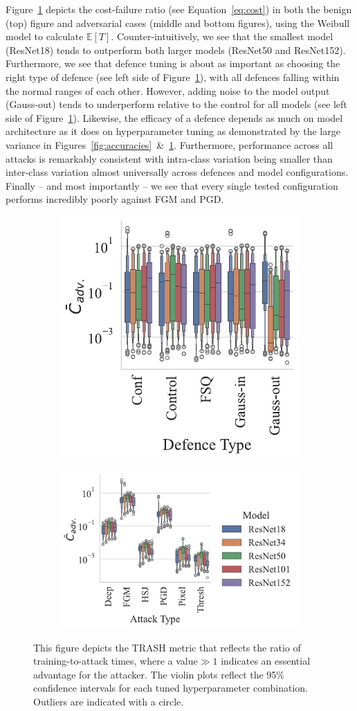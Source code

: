 Figure~\ref{fig:failures_per_train_time} depicts the cost-failure ratio (see Equation~\ref{eq:cost}) in both the benign (top) figure and adversarial cases (middle and bottom figures), using the Weibull model to calculate $\mathbb{E}[T]$. Counter-intuitively, we see that the smallest model (ResNet18) tends to outperform both larger models (ResNet50 and ResNet152). Furthermore, we see that defence tuning is about as important as choosing the right type of defence (see left side of Figure~\ref{fig:failures_per_train_time}), with all defences falling within the normal ranges of each other. However, adding noise to the model output (Gauss-out) tends to underperform relative to the control for all models (see left side of Figure~\ref{fig:failures_per_train_time}). Likewise, the efficacy of a defence depends as much on model architecture as it does on hyperparameter tuning as demonstrated by the large variance in Figures~\ref{fig:accuracies}~\&~\ref{fig:failures_per_train_time}.  Furthermore, performance across all attacks is remarkably consistent with intra-class variation being smaller than inter-class variation almost universally across defences and model configurations.
Finally -- and most importantly -- we see that every single tested configuration performs incredibly poorly against FGM and PGD\@.

\begin{figure}[!ht]
    \centering
    \begin{subfigure}
        \centering
        \includegraphics[width=.38\textwidth,trim={12pt 10pt 20pt 10pt},clip]{plots/trash_score_vs_defence_type.pdf}
    \end{subfigure}
    \begin{subfigure}
        \centering
        \includegraphics[width=.38\textwidth,trim={12pt 10pt 20pt 10pt},clip]{plots/trash_score_vs_attack_type.pdf}
    \end{subfigure}
    \caption{This figure depicts the TRASH metric that reflects the ratio of training-to-attack times, where a value$\gg 1 $  indicates an essential advantage for the attacker. The violin plots reflect the 95\% confidence intervals for each tuned hyperparameter combination. Outliers are indicated with a circle.}
	\label{fig:failures_per_train_time}
\end{figure}